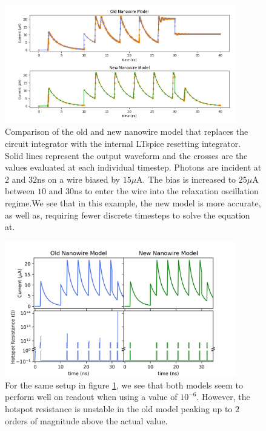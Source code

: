 \begin{figure}
    \centering
    \includegraphics[width=0.9\textwidth]{figs/int_improvement_1e-3.png}
    \caption{Comparison of the old and new nanowire model that replaces the
    circuit integrator with the internal LTspice resetting integrator. Solid
    lines represent the output waveform and the crosses are the values evaluated at each
    individual timestep. Photons are incident at $2$ and $32$ns on a wire biased by $15\mu$A.
    The bias is increased to $25\mu$A between $10$ and $30$ns to enter the wire into the
    relaxation oscillation regime.We see that in this example, the new model is more accurate, as well as, requiring fewer discrete timesteps to solve the equation at.}
    \label{fig:int_improvement_1e-3}
\end{figure}

\begin{figure}
    \centering
    \includegraphics[width=0.9\textwidth]{figs/int_improvement_1e-6.png}
    \caption{For the same setup in figure \ref{fig:int_improvement_1e-3}, we see
    that both models seem to perform well on readout when using a  value
    of $10^{-6}$. However, the hotspot resistance is unstable in the old model peaking
    up to $2$ orders of magnitude above the actual value.}
    \label{fig:int_improvement_1e-6}
\end{figure}

